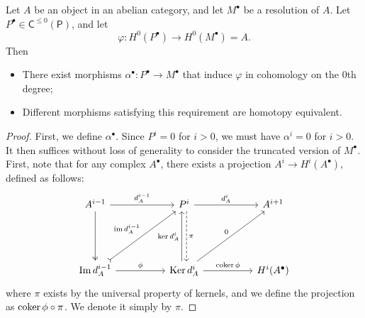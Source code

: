 \begin{lemma}\label{lma:9.6.1}
	Let $A$ be an object in an abelian category, and let $M^{\bullet} $ be a resolution of $A$. Let $P^{\bullet} \in \mathsf{C} ^{\leq 0} (\mathsf{P} )$, and let
	\[
		\varphi : H^0(P^{\bullet} ) \to H^0(M^{\bullet} )=A
	.\]
	Then
	\begin{itemize}
		\item There exist morphisms $\alpha ^{\bullet} : P^{\bullet}  \to M^{\bullet} $ that induce $\varphi $ in cohomology on the 0th degree;
		\item Different morphisms satisfying this requirement are homotopy equivalent.
	\end{itemize}
\end{lemma}
\begin{proof}
	First, we define $\alpha ^{\bullet} $. Since $P^i=0$ for $i>0$, we must have $\alpha ^i=0$ for $i>0$. It then suffices without loss of generality to consider the truncated version of $M^{\bullet} $. First, note that for any complex $A^{\bullet} $, there exists a projection $A^i \to H^i(A^{\bullet} )$, defined as follows:
	\[\begin{tikzcd}[row sep = 5em, column sep = 5em]
		A^{i-1}\ar[r, "d_A^{i-1} "]\ar[d, two heads]&P^{i} \ar[d, shift left, dashed, "\pi "]\ar[r, "d_A^{i} "]&A^{i+1} \\
		\Im d_A^{i-1} \ar[ur, tail, "\im d_A^{i-1} "]\ar[r, "\phi "]&\Ker d_A^i\ar[r, "\coker \phi "]\ar[u, shift left, "\ker d_A^i"]\arrow[ur, "0"]&H^i(A^{\bullet} ) 
	\end{tikzcd}\]
	where $\pi $ exists by the universal property of kernels, and we define the projection as $\operatorname{coker} \phi \circ \pi $. We denote it simply by $\pi $.


\end{proof}
